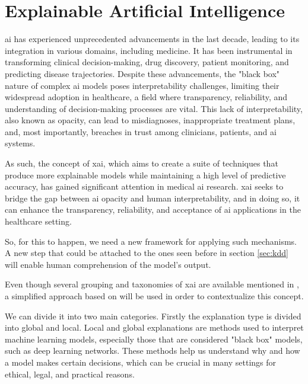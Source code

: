 \section{Explainable Artificial Intelligence}\label{subsec:xai}
\ac{ai} has experienced unprecedented advancements in the last decade, leading to its integration in various domains, including medicine. It has been instrumental in transforming clinical decision-making, drug discovery, patient monitoring, and predicting disease trajectories. Despite these advancements, the "black box" nature of complex \ac{ai} models poses interpretability challenges, limiting their widespread adoption in healthcare, a field where transparency, reliability, and understanding of decision-making processes are vital. This lack of interpretability, also known as opacity, can lead to misdiagnoses, inappropriate treatment plans, and, most importantly, breaches in trust among clinicians, patients, and \ac{ai} systems.

As such, the concept of \ac{xai}, which aims to create a suite of techniques that produce more explainable models while maintaining a high level of predictive accuracy, has gained significant attention in medical \ac{ai} research. \ac{xai} seeks to bridge the gap between \ac{ai} opacity and human interpretability, and in doing so, it can enhance the transparency, reliability, and acceptance of \ac{ai} applications in the healthcare setting.

So, for this to happen, we need a new framework for applying such mechanisms. A new step that could be attached to the ones seen before in section \ref{sec:kdd} will enable human comprehension of the model's output.

Even though several grouping and taxonomies of \ac{xai} are available mentioned in \cite{adadiPeekingBlackBoxSurvey2018,linardatosExplainableAIReview2020,barredoarrietaExplainableArtificialIntelligence2020,linardatosExplainableAIReview2020,kamath2021explainable}, a simplified approach based on \cite{kamath2021explainable} will be used in order to contextualize this concept.

We can divide it into two main categories. Firstly the explanation type is divided into global and local. Local and global explanations are methods used to interpret machine learning models, especially those that are considered "black box" models, such as deep learning networks. These methods help us understand why and how a model makes certain decisions, which can be crucial in many settings for ethical, legal, and practical reasons.

